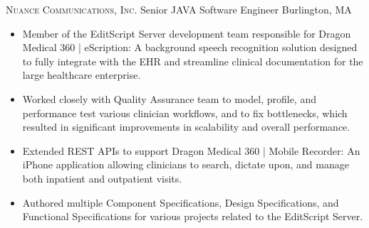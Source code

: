 \documentclass[11pt,letterpaper,roman]{moderncv} %
\begin{document}
		{\textsc{Nuance Communications, Inc.}}	{Senior JAVA Software Engineer}		{Burlington, MA}	{}
	{
	\begin{itemize}
		\item Member of the EditScript Server development team responsible for Dragon Medical 360 | eScription: A background speech recognition solution designed to fully integrate with the EHR and streamline clinical documentation for the large healthcare enterprise. 
		\item Worked closely with Quality Assurance team to model, profile, and performance test various clinician workflows, and to fix bottlenecks, which resulted in significant improvements in scalability and overall performance.
		\item Extended REST APIs to support Dragon Medical 360 | Mobile Recorder: An iPhone application allowing clinicians to search, dictate upon, and manage both inpatient and outpatient visits.
		\item Authored multiple Component Specifications, Design Specifications, and Functional Specifications for various projects related to the EditScript Server.
	\end{itemize}
	}

\end{document}
